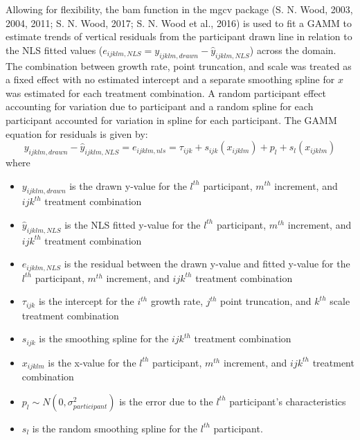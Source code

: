 \documentclass[print]{nuthesis}
\providecommand{\tightlist}{%
  \setlength{\itemsep}{0pt}\setlength{\parskip}{0pt}}
\begin{document}
Allowing for flexibility, the bam function in the mgcv package (S. N. Wood, 2003, 2004, 2011; S. N. Wood, 2017; S. N. Wood et al., 2016) is used to fit a GAMM to estimate trends of vertical residuals from the participant drawn line in relation to the NLS fitted values (\(e_{ijklm,NLS} = y_{ijklm,drawn} - \hat y_{ijklm,NLS}\)) across the domain.
The combination between growth rate, point truncation, and scale was treated as a fixed effect with no estimated intercept and a separate smoothing spline for \(x\) was estimated for each treatment combination.
A random participant effect accounting for variation due to participant and a random spline for each participant accounted for variation in spline for each participant.
The GAMM equation for residuals is given by:
\begin{equation}
y_{ijklm,drawn} - \hat y_{ijklm,NLS} = e_{ijklm,nls} = \tau_{ijk} + s_{ijk}(x_{ijklm}) + p_{l} + s_{l}(x_{ijklm})
\end{equation}
\noindent where

\begin{itemize}
\tightlist
\item
  \(y_{ijklm,drawn}\) is the drawn y-value for the \(l^{th}\) participant, \(m^{th}\) increment, and \(ijk^{th}\) treatment combination
\item
  \(\hat y_{ijklm,NLS}\) is the NLS fitted y-value for the \(l^{th}\) participant, \(m^{th}\) increment, and \(ijk^{th}\) treatment combination
\item
  \(e_{ijklm,NLS}\) is the residual between the drawn y-value and fitted y-value for the \(l^{th}\) participant, \(m^{th}\) increment, and \(ijk^{th}\) treatment combination
\item
  \(\tau_{ijk}\) is the intercept for the \(i^{th}\) growth rate, \(j^{th}\) point truncation, and \(k^{th}\) scale treatment combination
\item
  \(s_{ijk}\) is the smoothing spline for the \(ijk^{th}\) treatment combination
\item
  \(x_{ijklm}\) is the x-value for the \(l^{th}\) participant, \(m^{th}\) increment, and \(ijk^{th}\) treatment combination
\item
  \(p_{l} \sim N(0, \sigma^2_{participant})\) is the error due to the \(l^{th}\) participant's characteristics
\item
  \(s_{l}\) is the random smoothing spline for the \(l^{th}\) participant.
\end{itemize}
\end{document}
